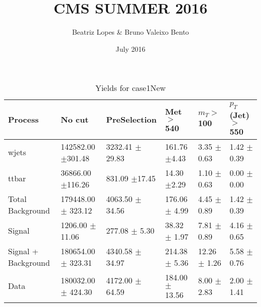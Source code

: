 \documentclass{article}
\title{CMS SUMMER 2016}
\author{Beatriz Lopes &  Bruno Valeixo Bento}
\date{July 2016}
\begin{document}
\maketitle
\begin{table}[!h]
\begin{tabular}{llllll}
\hline
Process & No cut& PreSelection& Met $>$ 540& $m_T >$ 100& $p_T$ (Jet) $>$ 550\\
\hline
wjets & 142582.00 $\pm$301.48 & 3232.41 $\pm$29.83 & 161.76 $\pm$4.43 & 3.35 $\pm$0.63 & 1.42 $\pm$0.39 \\
ttbar & 36866.00 $\pm$116.26 & 831.09 $\pm$17.45 & 14.30 $\pm$2.29 & 1.10 $\pm$0.63 & 0.00 $\pm$0.00 \\
Total Background & 179448.00 $\pm$ 323.12 & 4063.50 $\pm$ 34.56 & 176.06 $\pm$ 4.99 & 4.45 $\pm$ 0.89 & 1.42 $\pm$ 0.39 \\
\hline
Signal & 1206.00 $\pm$ 11.06 & 277.08 $\pm$ 5.30 & 38.32 $\pm$ 1.97 & 7.81 $\pm$ 0.89 & 4.16 $\pm$ 0.65 \\
\hline
Signal + Background & 180654.00 $\pm$ 323.31 & 4340.58 $\pm$ 34.97 & 214.38 $\pm$ 5.36 & 12.26 $\pm$ 1.26 & 5.58 $\pm$ 0.76 \\
\hline
\hline
Data & 180032.00 $\pm$ 424.30 & 4172.00 $\pm$ 64.59 & 184.00 $\pm$ 13.56 & 8.00 $\pm$ 2.83 & 2.00 $\pm$ 1.41 \\
\hline
\end{tabular}
\caption{Yields for case1New}
\end{table}
\end{document}
